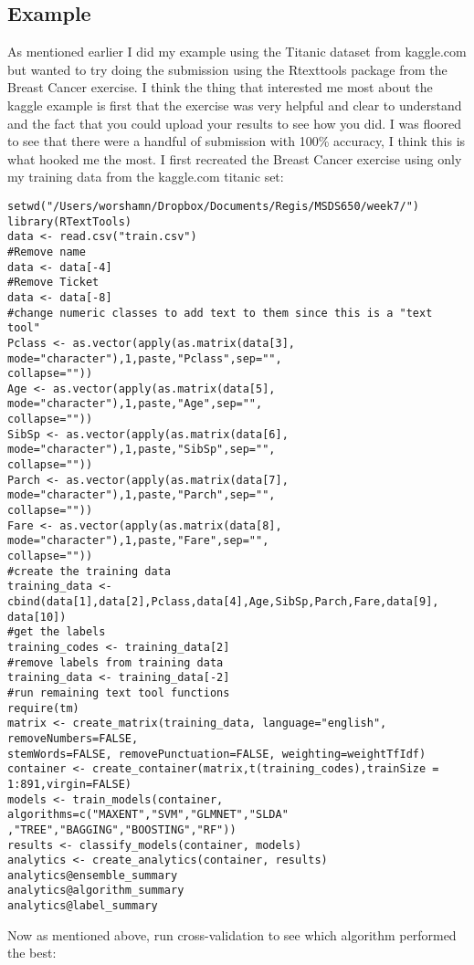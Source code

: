 \documentclass[10pt]{article}
\begin{document}
\subsection*{Example}
As mentioned earlier I did my example using the Titanic dataset from kaggle.com but wanted to try doing the submission using the Rtexttools package from the Breast Cancer exercise. I think the thing that interested me most about the kaggle example is first that the exercise was very helpful and clear to understand and the fact that you could upload your results to see how you did. I was floored to see that there were a handful of submission with 100\% accuracy, I think this is what hooked me the most. I first recreated the Breast Cancer exercise using only my training data from the kaggle.com titanic set:
\begin{verbatim}
setwd("/Users/worshamn/Dropbox/Documents/Regis/MSDS650/week7/")
library(RTextTools)
data <- read.csv("train.csv")
#Remove name
data <- data[-4]
#Remove Ticket
data <- data[-8]
#change numeric classes to add text to them since this is a "text tool"
Pclass <- as.vector(apply(as.matrix(data[3], mode="character"),1,paste,"Pclass",sep="",
collapse=""))
Age <- as.vector(apply(as.matrix(data[5], mode="character"),1,paste,"Age",sep="",
collapse=""))
SibSp <- as.vector(apply(as.matrix(data[6], mode="character"),1,paste,"SibSp",sep="",
collapse=""))
Parch <- as.vector(apply(as.matrix(data[7], mode="character"),1,paste,"Parch",sep="",
collapse=""))
Fare <- as.vector(apply(as.matrix(data[8], mode="character"),1,paste,"Fare",sep="",
collapse=""))
#create the training data
training_data <- cbind(data[1],data[2],Pclass,data[4],Age,SibSp,Parch,Fare,data[9],
data[10])
#get the labels
training_codes <- training_data[2]
#remove labels from training data
training_data <- training_data[-2]
#run remaining text tool functions
require(tm)
matrix <- create_matrix(training_data, language="english", removeNumbers=FALSE, 
stemWords=FALSE, removePunctuation=FALSE, weighting=weightTfIdf)
container <- create_container(matrix,t(training_codes),trainSize = 1:891,virgin=FALSE)
models <- train_models(container, algorithms=c("MAXENT","SVM","GLMNET","SLDA"
,"TREE","BAGGING","BOOSTING","RF"))
results <- classify_models(container, models)
analytics <- create_analytics(container, results)
analytics@ensemble_summary
analytics@algorithm_summary
analytics@label_summary
\end{verbatim}
Now as mentioned above, run cross-validation to see which algorithm performed the best:
\end{document}
